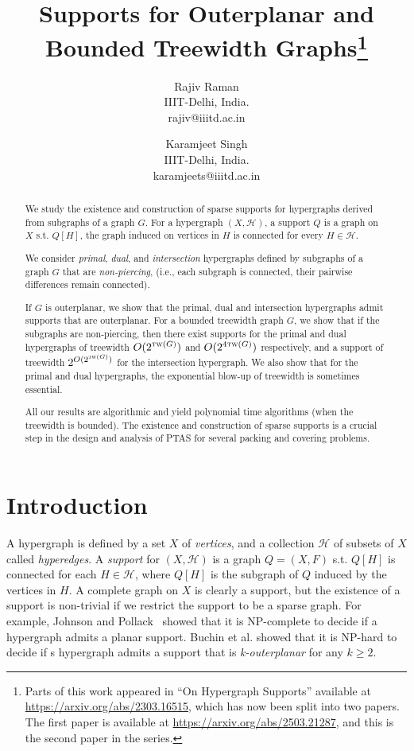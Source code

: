 \documentclass[12pt]{article}
\title{Supports for Outerplanar and Bounded Treewidth Graphs\footnote{Parts of this work appeared in ``On Hypergraph Supports'' 
available at \url{https://arxiv.org/abs/2303.16515}, which has now been
split into two papers. The first paper is available at \url{https://arxiv.org/abs/2503.21287}, and this is the second paper in the series.}}
\author{Rajiv Raman\\ IIIT-Delhi, India. \\ rajiv@iiitd.ac.in\and Karamjeet Singh \\ IIIT-Delhi, India. \\ karamjeets@iiitd.ac.in}
\newcommand{\tw}{\textsc{tw}}
\theoremstyle{case}
\begin{document}
\maketitle
\begin{abstract}
We study the existence and construction of sparse supports for hypergraphs derived from subgraphs of a graph $G$. For a hypergraph 
$(X,\mathcal{H})$, a support $Q$ is a graph on $X$ s.t.
$Q[H]$, the graph induced on vertices in $H$
is connected for every $H\in\mathcal{H}$.

We consider \emph{primal}, \emph{dual}, and 
\emph{intersection} hypergraphs defined by subgraphs 
of a graph $G$ that are \emph{non-piercing}, 
(i.e., each subgraph is connected, 
their pairwise differences remain connected).

If $G$ is outerplanar, we show that the primal, dual and
intersection hypergraphs admit supports that are outerplanar.
For a bounded treewidth graph $G$, we show
that if the subgraphs are non-piercing, then there exist
supports for the primal and dual hypergraphs of treewidth
$O(2^{\tw(G)})$ and $O(2^{4\tw(G)})$ respectively, and a support of treewidth $2^{O(2^{\tw(G)})}$
for the intersection hypergraph. We also show that for
the primal and dual hypergraphs, the exponential blow-up
of treewidth is sometimes essential. 

All our results are algorithmic and yield polynomial time
algorithms (when the treewidth is bounded).
The existence and construction of sparse supports is a crucial step
in the design and analysis of
PTAS for several packing and covering problems.
\end{abstract}

\section{Introduction}\label{sec:int}
A hypergraph is defined by a set $X$ of \emph{vertices}, and a collection $\mathcal{H}$
of subsets of $X$ called \emph{hyperedges}.
A \emph{support} for $(X,\mathcal{H})$ is a graph $Q=(X,F)$ s.t. 
$Q[H]$ is connected for each $H\in\mathcal{H}$, where $Q[H]$ is the subgraph of
$Q$ induced by the vertices in $H$.
A complete graph on $X$ is clearly a support, but the existence of a support is non-trivial if we restrict the support to be a sparse graph.
For example, Johnson and Pollack~\cite{Johnson1987Hypergraph} showed that it is NP-complete to decide if a hypergraph admits a planar support.
Buchin et al. \cite{buchin2011planar} showed that it is NP-hard to decide if s hypergraph admits a support that is \emph{k-outerplanar} for any $k\ge 2$.
\end{document}
